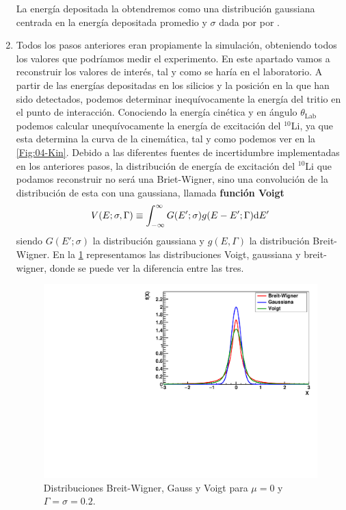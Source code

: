 \begin{enumerate}
    La energía depositada la obtendremos como una distribución gaussiana centrada en la energía depositada promedio y $\sigma$ dada por  por \label{Eq:Resolucion_Silicios}. 

    \item Todos los pasos anteriores eran propiamente la simulación, obteniendo todos los valores que podríamos medir el experimento. En este apartado vamos a reconstruir los valores de interés, tal y como se haría en el laboratorio.  A partir de las energías depositadas en los silicios y la posición en la que han sido detectados, podemos determinar inequívocamente la energía del tritio en el punto de interacción. Conociendo la energía cinética y en ángulo $\theta_{\text{Lab}}$ podemos calcular unequívocamente la energía de excitación del $^{10}$Li, ya que esta determina la curva de la cinemática, tal y como podemos ver en la \cref{Fig:04-Kin}. Debido a las diferentes fuentes de incertidumbre implementadas en los anteriores pasos, la distribución de energía de excitación del $^{10}$Li que podamos reconstruir no será una Briet-Wigner, sino una convolución de la distribución de esta con una gaussiana, llamada \textbf{función Voigt}
    \begin{equation}
        V(E;\sigma,\Gamma) \equiv \int_{-\infty}^{\infty} G(E';\sigma) g(E-E';\Gamma) \mathrm{d} E'
    \end{equation}
    siendo $G(E';\sigma)$ la distribución gaussiana y $g(E,\Gamma)$ la distribución Breit-Wigner. En la \cref{Fig:04-Funciones} representamos las distribuciones Voigt, gaussiana y breit-wigner, donde se puede ver la diferencia entre las tres. 

    \begin{figure}[H] \centering
        \includegraphics[width=0.7\linewidth]{Imagenes/PlotVoigtGaussBreitWigner.pdf}
        \caption{Distribuciones Breit-Wigner, Gauss y Voigt para $\mu=0$ y $\Gamma = \sigma=0.2$. }
        \label{Fig:04-Funciones}
    \end{figure}
    

\end{enumerate}
